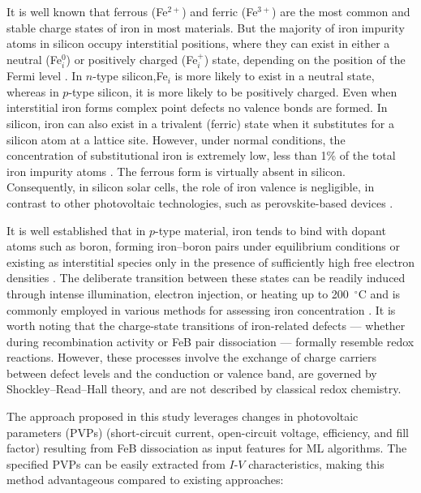 \documentclass[a4paper,fleqn]{cas-sc}
\begin{document}
It is well known that ferrous (Fe$^{2+}$) and ferric (Fe$^{3+}$) are the most common and stable charge states of iron in most materials.
But the majority of iron impurity atoms in silicon occupy interstitial positions,
where they can exist in either a neutral (Fe$_i^0$) or positively charged (Fe$_i^+$) state,
depending on the position of the Fermi level \cite{Macdonald2004,Istratov1999}.
In $n$-type silicon,Fe$_i$ is more likely to exist in a neutral state,
whereas in $p$-type silicon, it is more likely to be positively charged.
Even when interstitial iron forms complex point defects no valence bonds are formed.
In silicon, iron can also exist in a trivalent (ferric) state when it substitutes for a silicon atom at a lattice site.
However, under normal conditions, the concentration of substitutional iron is extremely low, less than 1\% of the total iron impurity atoms \cite{Wright2016}.
The ferrous form is virtually absent in silicon.
Consequently, in silicon solar cells, the role of iron valence is negligible,
in contrast to other photovoltaic technologies, such as perovskite-based devices \cite{Poindexter2017}.


It is well established that in $p$-type material,
iron tends to bind with dopant atoms such as boron, forming iron–boron pairs under equilibrium conditions
or existing as interstitial species only in the presence of sufficiently high free electron densities \cite{Kimerling1983, FeBAssJAP2014}.
The deliberate transition between these states can be readily induced
through intense illumination, electron injection, or heating up to 200~$^\circ$C and
is commonly employed in various methods for assessing iron concentration
\cite{Macdonald2004,Zoth1990, Rein2, Schmidt2005, Goodarzi2017, Olikh2021JAP, FeMethod2012, Herguth2022}.
It is worth noting that the charge-state transitions of iron-related defects ---
whether during recombination activity or FeB pair dissociation --- formally resemble redox reactions.
However, these processes involve the exchange of charge carriers between defect levels and the conduction or valence band,
are governed by Shockley–Read–Hall theory, and are not described by classical redox chemistry.


The approach proposed in this study leverages changes in photovoltaic parameters (PVPs)
(short-circuit current, open-circuit voltage, efficiency, and fill factor) resulting from FeB dissociation as input features for ML algorithms.
The specified PVPs can be easily extracted from $I$-$V$ characteristics, making this method advantageous compared to existing approaches:
\end{document}
